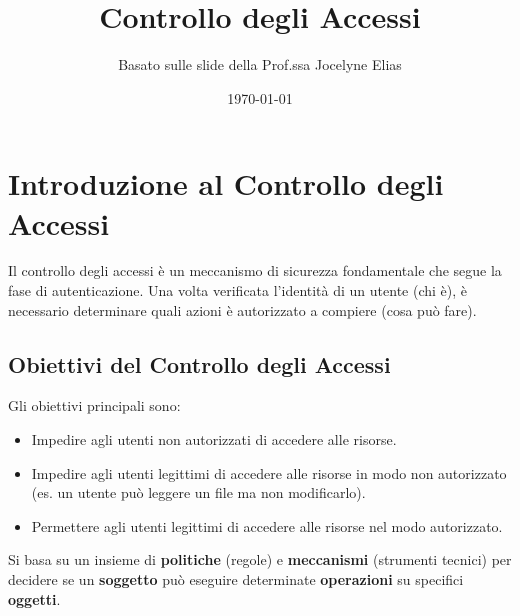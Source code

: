 

\title{Controllo degli Accessi}
\author{Basato sulle slide della Prof.ssa Jocelyne Elias}
\date{\today}



\maketitle
\tableofcontents
\newpage

\section{Introduzione al Controllo degli Accessi}
Il controllo degli accessi è un meccanismo di sicurezza fondamentale che segue la fase di autenticazione. Una volta verificata l'identità di un utente (chi è), è necessario determinare quali azioni è autorizzato a compiere (cosa può fare).

\subsection{Obiettivi del Controllo degli Accessi}
Gli obiettivi principali sono:
\begin{itemize}
    \item Impedire agli utenti non autorizzati di accedere alle risorse.
    \item Impedire agli utenti legittimi di accedere alle risorse in modo non autorizzato (es. un utente può leggere un file ma non modificarlo).
    \item Permettere agli utenti legittimi di accedere alle risorse nel modo autorizzato.
\end{itemize}
Si basa su un insieme di \textbf{politiche} (regole) e \textbf{meccanismi} (strumenti tecnici) per decidere se un \textbf{soggetto} può eseguire determinate \textbf{operazioni} su specifici \textbf{oggetti}.

